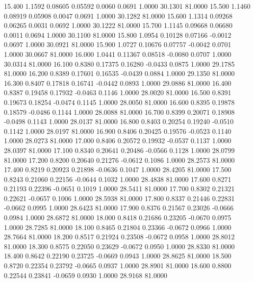   15.400   1.1592   0.08605   0.05592   0.0060   0.0691   1.0000  30.1301  81.0000
  15.500   1.1460   0.08919   0.05908   0.0047   0.0691   1.0000  30.1282  81.0000
  15.600   1.1314   0.09268   0.06265   0.0031   0.0692   1.0000  30.1222  81.0000
  15.700   1.1145   0.09668   0.06680   0.0011   0.0694   1.0000  30.1100  81.0000
  15.800   1.0954   0.10128   0.07166  -0.0012   0.0697   1.0000  30.0921  81.0000
  15.900   1.0727   0.10676   0.07757  -0.0042   0.0701   1.0000  30.0667  81.0000
  16.000   1.0441   0.11367   0.08518  -0.0080   0.0707   1.0000  30.0314  81.0000
  16.100   0.8380   0.17375   0.16280  -0.0433   0.0875   1.0000  29.1785  81.0000
  16.200   0.8389   0.17601   0.16535  -0.0439   0.0884   1.0000  29.1350  81.0000
  16.300   0.8407   0.17818   0.16741  -0.0442   0.0893   1.0000  29.0886  81.0000
  16.400   0.8387   0.19458   0.17932  -0.0463   0.1146   1.0000  28.0020  81.0000
  16.500   0.8391   0.19673   0.18254  -0.0474   0.1145   1.0000  28.0050  81.0000
  16.600   0.8395   0.19878   0.18579  -0.0486   0.1144   1.0000  28.0088  81.0000
  16.700   0.8399   0.20071   0.18908  -0.0498   0.1143   1.0000  28.0137  81.0000
  16.800   0.8403   0.20254   0.19240  -0.0510   0.1142   1.0000  28.0197  81.0000
  16.900   0.8406   0.20425   0.19576  -0.0523   0.1140   1.0000  28.0273  81.0000
  17.000   0.8406   0.20572   0.19932  -0.0537   0.1137   1.0000  28.0397  81.0000
  17.100   0.8340   0.20641   0.20486  -0.0566   0.1128   1.0000  28.0799  81.0000
  17.200   0.8200   0.20640   0.21276  -0.0612   0.1086   1.0000  28.2573  81.0000
  17.400   0.8219   0.20923   0.21898  -0.0636   0.1047   1.0000  28.4205  81.0000
  17.500   0.8243   0.21060   0.22156  -0.0644   0.1032   1.0000  28.4838  81.0000
  17.600   0.8271   0.21193   0.22396  -0.0651   0.1019   1.0000  28.5411  81.0000
  17.700   0.8302   0.21321   0.22621  -0.0657   0.1006   1.0000  28.5938  81.0000
  17.800   0.8337   0.21446   0.22831  -0.0662   0.0995   1.0000  28.6423  81.0000
  17.900   0.8376   0.21567   0.23026  -0.0666   0.0984   1.0000  28.6872  81.0000
  18.000   0.8418   0.21686   0.23205  -0.0670   0.0975   1.0000  28.7285  81.0000
  18.100   0.8465   0.21804   0.23366  -0.0672   0.0966   1.0000  28.7664  81.0000
  18.200   0.8517   0.21924   0.23508  -0.0672   0.0958   1.0000  28.8012  81.0000
  18.300   0.8575   0.22050   0.23629  -0.0672   0.0950   1.0000  28.8330  81.0000
  18.400   0.8642   0.22190   0.23725  -0.0669   0.0943   1.0000  28.8625  81.0000
  18.500   0.8720   0.22354   0.23792  -0.0665   0.0937   1.0000  28.8901  81.0000
  18.600   0.8800   0.22544   0.23841  -0.0659   0.0930   1.0000  28.9168  81.0000
